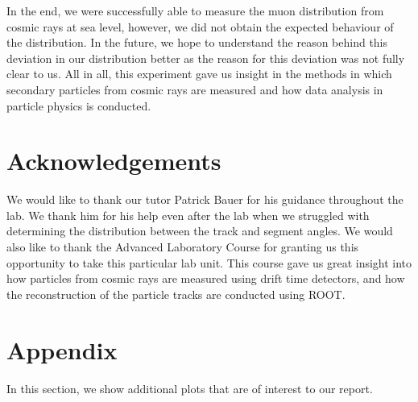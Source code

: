 \documentclass[a4paper]{report}
\numberwithin{equation}{section}
\begin{document}
In the end, we were successfully able to measure the muon distribution from cosmic rays at sea level, however, we did not obtain
the expected behaviour of the distribution. In the future, we hope to understand the reason behind this deviation in our distribution better as 
the reason for this deviation was not fully clear to us. All in all, this experiment gave us insight in the methods in which 
secondary particles from cosmic rays are measured and how data analysis in particle physics is conducted.


\chapter{Acknowledgements}

We would like to thank our tutor Patrick Bauer for his guidance throughout the lab. We thank him for his help even after the lab 
when we struggled with determining the distribution between the track and segment angles. We would also like to thank the Advanced 
Laboratory Course for granting us this opportunity to take this particular lab unit. This course gave us great insight into 
how particles from cosmic rays are measured using drift time detectors, and how the reconstruction of the particle tracks are 
conducted using ROOT. 

\printbibliography

\chapter{Appendix} \label{chap:appendix}

In this section, we show additional plots that are of interest to our report.\par 
\end{document}
